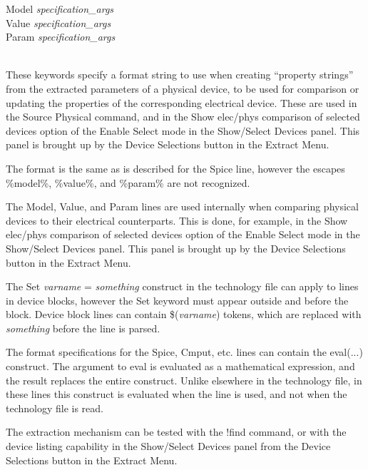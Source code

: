 \begin{description}
\item\parbox[b]{4in}{\et
Model {\it specification\_args}\\
Value {\it specification\_args}\\
Param {\it specification\_args}
}\\
These keywords specify a format string to use when creating ``property
strings'' from the extracted parameters of a physical device, to be
used for comparison or updating the properties of the corresponding
electrical device.  These are used in the {\cb Source Physical}
command, and in the {\cb Show elec/phys comparison of selected
devices} option of the {\cb Enable Select} mode in the {\cb
Show/Select Devices} panel.  This panel is brought up by the {\cb
Device Selections} button in the {\cb Extract Menu}.

The format is the same as is described for the {\et Spice} line,
however the escapes {\vt \%model\%}, {\vt \%value\%}, and {\vt
\%param\%} are not recognized. 

The {\et Model}, {\et Value}, and {\et Param} lines are used
internally when comparing physical devices to their electrical
counterparts.  This is done, for example, in the {\cb Show elec/phys
comparison of selected devices} option of the {\cb Enable Select} mode
in the {\cb Show/Select Devices} panel.  This panel is brought up by
the {\cb Device Selections} button in the {\cb Extract Menu}.

\end{description}

The {\et Set {\it varname} = {\it something}} construct in the
technology file can apply to lines in device blocks, however the
{\et Set} keyword must appear outside and before the block.  Device
block lines can contain {\vt \$(}{\it varname}{\vt )} tokens, which
are replaced with {\it something} before the line is parsed.

The format specifications for the {\et Spice}, {\et Cmput}, etc. 
lines can contain the {\et eval(...)} construct.  The argument to {\et
eval} is evaluated as a mathematical expression, and the result
replaces the entire construct.  Unlike elsewhere in the technology
file, in these lines this construct is evaluated when the line is
used, and not when the technology file is read.

The extraction mechanism can be tested with the {\cb !find} command,
or with the device listing capability in the {\cb Show/Select Devices}
panel from the {\cb Device Selections} button in the {\cb Extract
Menu}.

